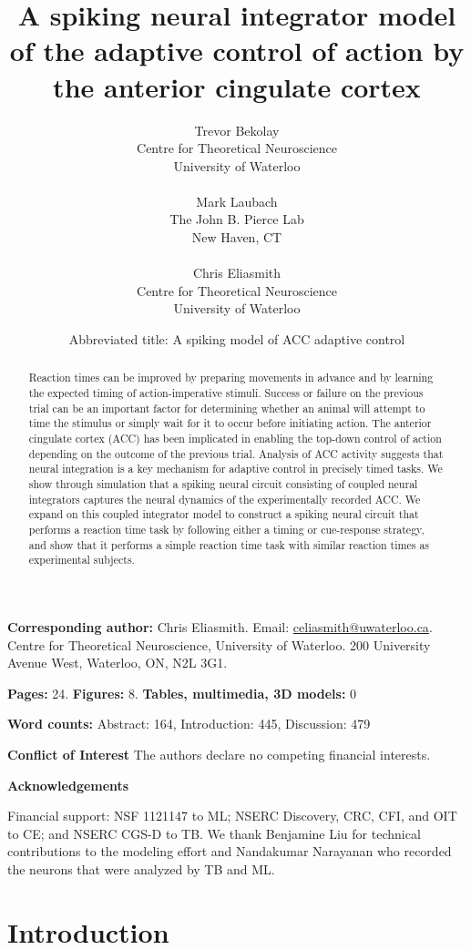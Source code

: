 \documentclass[11pt]{article}
\title{A spiking neural integrator model of the adaptive control of
  action by the anterior cingulate cortex}
\date{Abbreviated title: A spiking model of ACC adaptive control}
\author{%
  Trevor Bekolay \\
  Centre for Theoretical Neuroscience \\
  University of Waterloo \\ ~ \\
  Mark Laubach \\
  The John B. Pierce Lab \\
  New Haven, CT \\ ~ \\
  Chris Eliasmith \\
  Centre for Theoretical Neuroscience \\
  University of Waterloo}
\begin{document}
\maketitle

\textbf{Corresponding author:} Chris Eliasmith.
Email: \url{celiasmith@uwaterloo.ca}.
Centre for Theoretical Neuroscience, University of Waterloo.
200 University Avenue West, Waterloo, ON, N2L 3G1.

\textbf{Pages:} 24. \textbf{Figures:} 8. \textbf{Tables, multimedia, 3D models:} 0

\textbf{Word counts:} Abstract: 164, Introduction: 445, Discussion: 479

\textbf{Conflict of Interest}
The authors declare no competing financial interests.

\textbf{Acknowledgements}

Financial support: NSF 1121147 to ML;
NSERC Discovery, CRC, CFI, and OIT to CE;
and NSERC CGS-D to TB.
We thank Benjamine Liu for technical contributions
to the modeling effort and
Nandakumar Narayanan who recorded the neurons
that were analyzed by TB and ML.

\clearpage

\begin{abstract}
  Reaction times can be improved by preparing movements
  in advance and by learning the expected timing
  of action-imperative stimuli.
  Success or failure on the previous trial
  can be an important factor for determining
  whether an animal will attempt to time
  the stimulus or simply wait for it to occur
  before initiating action.
  The anterior cingulate cortex (ACC) has been implicated
  in enabling the top-down control of action
  depending on the outcome of the previous trial.
  Analysis of ACC activity suggests that
  neural integration is a key mechanism
  for adaptive control in precisely timed tasks.
  We show through simulation
  that a spiking neural circuit
  consisting of coupled neural integrators
  captures the neural dynamics
  of the experimentally recorded ACC.
  We expand on this coupled integrator model
  to construct a spiking neural circuit that
  performs a reaction time task by following
  either a timing or cue-response strategy,
  and show that it performs a simple reaction time task
  with similar reaction times as experimental subjects.
\end{abstract}

\linespread{1.5}

\section{Introduction}
\end{document}
